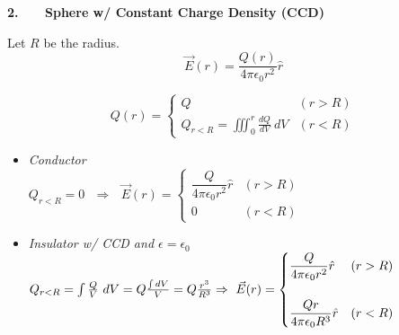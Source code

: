 \documentclass[12pt]{article}
\begin{document}
%
%
%
\newpage 
\noindent
\begin{minipage}[t]{0.45\textwidth}
	\textbf{2. \ \ \ Sphere w/ Constant Charge Density (CCD)}

	\vspace{5pt}
	Let \(R\) be the radius.
	\[ \vec{E}(r) = \frac{ Q(r) }{4 \pi \epsilon_0 r^2} \hat{r} \]

	\vspace{5pt}
	\[ Q(r) = \begin{cases}
		Q & (r > R)\\
		Q_{r<R} = \iiint_0^r \frac{dQ}{dV} \ dV & (r < R)
	\end{cases} \]

	\vspace{10pt}
	\begin{itemize}
		\item \emph{Conductor}\\[10pt]
		\( Q_{r<R} = 0
		\ \ \ \Rightarrow \ \ \ \vec{E}(r) = \begin{cases}
			\dfrac{ Q }{4 \pi \epsilon_0 r^2} \hat{r} & (r > R)\\
			0 & (r < R)
		\end{cases} \)
	\end{itemize}

	\vspace{10pt}
	\begin{itemize}
		\item \emph{Insulator w/ CCD and \(\epsilon = \epsilon_0\)} \\[10pt]
		\( Q_{r<R} = \int \frac{Q}{V} \ dV = Q \frac{\int dV}{V} = Q \frac{r^3}{R^3}\\[5pt]
		\Rightarrow \ \vec{E}(r) = \begin{cases}
			\dfrac{ Q }{4 \pi \epsilon_0 r^2} \hat{r} & (r > R)\\[20pt]
			\dfrac{ Q r}{4 \pi \epsilon_0 R^3} \hat{r} & (r < R)
		\end{cases} \)
	\end{itemize}
\end{minipage}
\hfill\vline\hfill
\end{document}
